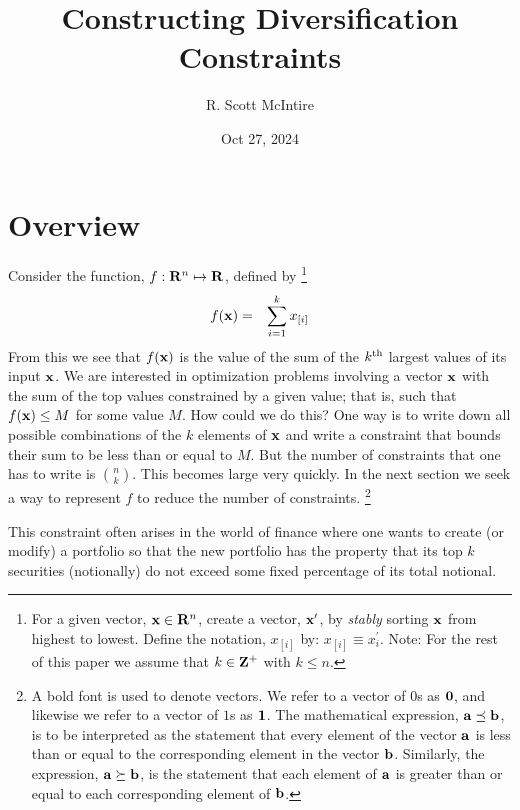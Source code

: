 \documentclass[12pt]{article}
\title{Constructing Diversification Constraints}
\author{R. Scott McIntire}
\date{Oct 27, 2024}
\begin{document}
\maketitle

\section{Overview}
Consider the function, $f: {\bf R}^n \mapsto {\bf R}$, defined by%
\footnote{
For a given vector, ${\bf x} \in {\bf R}^n$, create a vector,  
${\bf x}^\prime$,
by {\it stably\/} sorting ${\bf x}$ from highest to lowest.
Define the notation, $x_{[i]}$ by: $x_{[i]} \equiv x_{i}^\prime$.
Note: For the rest of this paper we assume that $k \in {\bf Z}^+$ with $k \le n$.}
\begin{eqnarray}
	f({\bf x}) & = & \sum_{i=1}^k x_{[i]} 
\end{eqnarray}
From this we see that $f({\bf x})$ is the value of the sum of the $k^{\rm th}$ 
largest values of its input ${\bf x}$.
We are interested in optimization problems involving a vector ${\bf x}$ 
with the sum of the top values constrained by a given value; that is, 
such that $f({\bf x}) \le M$ for some value $M$.
How could we do this? One way is to write down all possible combinations of the 
$k$ elements of ${\bf x}$ and write a constraint that bounds their sum to be 
less than or equal to $M$.  But the number of constraints that one has to 
write is $n \choose k$. This becomes large very quickly. 
In the next section we seek a way to represent $f$ to 
reduce the number of constraints.%
\footnote{A bold font is used to denote vectors. We refer to a  
vector of $0$s as ${\bf 0}$, and likewise we refer to a vector of $1$s
as ${\bf 1}$. The mathematical expression, ${\bf a} \preceq {\bf b}$, is to be 
interpreted as the statement that every element of the vector ${\bf a}$ is 
less than or equal to the corresponding element in the vector ${\bf b}$. 
Similarly, the expression, ${\bf a} \succeq {\bf b}$, is the statement that 
each element of ${\bf a}$ is greater than or equal to each 
corresponding element of ${\bf b}$.
}

This constraint often arises in the world of finance where one wants to 
create (or modify) a portfolio so that the new portfolio has the property
that its top $k$ securities (notionally) do not exceed some fixed percentage 
of its total notional.
\end{document}
